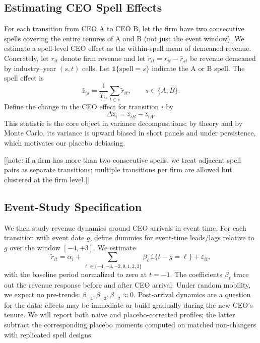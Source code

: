 \documentclass[11pt,a4paper]{article}
\begin{document}
\subsection*{Estimating CEO Spell Effects}
For each transition from CEO A to CEO B, let the firm have two consecutive spells covering the entire tenures of A and B (not just the event window). We estimate a spell-level CEO effect as the within-spell mean of demeaned revenue. Concretely, let \(r_{it}\) denote firm revenue and let \(\tilde r_{it}=r_{it}-\bar r_{st}\) be revenue demeaned by industry–year \((s,t)\) cells. Let \(\mathbb 1\{\text{spell}=s\}\) indicate the A or B spell. The spell effect is
\begin{equation}
\hat z_{is} = \frac{1}{T_{is}}\sum_{t\in s} \tilde r_{it},\qquad s\in\{A,B\}.
\end{equation}
Define the change in the CEO effect for transition \(i\) by
\begin{equation}
\Delta \hat z_i = \hat z_{iB} - \hat z_{iA}.
\end{equation}
This statistic is the core object in variance decompositions; by theory and by Monte Carlo, its variance is upward biased in short panels and under persistence, which motivates our placebo debiasing.

[[note: if a firm has more than two consecutive spells, we treat adjacent spell pairs as separate transitions; multiple transitions per firm are allowed but clustered at the firm level.]]

\subsection*{Event-Study Specification}
We then study revenue dynamics around CEO arrivals in event time. For each transition with event date \(g\), define dummies for event-time leads/lags relative to \(g\) over the window \([-4,+3]\). We estimate
\begin{equation}
\tilde r_{it} = \alpha_i + \sum_{\ell\in\{-4,-3,-2,0,1,2,3\}} \beta_{\ell}\,\mathbb 1\{t-g=\ell\} + \varepsilon_{it},
\end{equation}
with the baseline period normalized to zero at \(t=-1\). The coefficients \(\beta_{\ell}\) trace out the revenue response before and after CEO arrival. Under random mobility, we expect no pre-trends: \(\beta_{-4},\beta_{-3},\beta_{-2}\approx 0\). Post-arrival dynamics are a question for the data: effects may be immediate or build gradually during the new CEO’s tenure. We will report both naive and placebo-corrected profiles; the latter subtract the corresponding placebo moments computed on matched non-changers with replicated spell designs.
\end{document}
